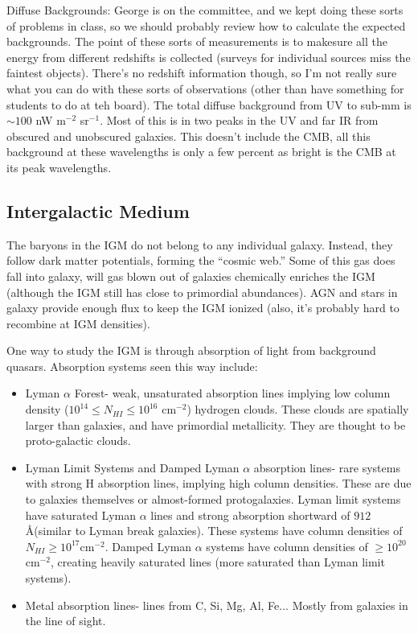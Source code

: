 Diffuse Backgrounds:\newline
George is on the committee, and we kept doing these sorts of problems in 
class, so we should probably review how to calculate the expected backgrounds.  
The point of these sorts of measurements is to makesure all the energy 
from different redshifts is collected (surveys for individual sources 
miss the faintest objects).  There's no redshift information though, so I'm not 
really sure what you can do with these sorts of observations (other than 
have something for students to do at teh board).  The total diffuse 
background from UV to sub-mm is $\sim100$ nW m$^{-2}$ sr$^{-1}$.  Most of 
this is in two peaks in the UV and far IR from obscured and unobscured 
galaxies.  This doesn't include the CMB, all this background at these 
wavelengths is only a few percent as bright is the CMB at its peak 
wavelengths.  

\subsection{Intergalactic Medium}
The baryons in the IGM do not belong to any individual galaxy.  Instead, 
they follow dark matter potentials, forming the ``cosmic web.''  Some of 
this gas does fall into galaxy, will gas blown out of galaxies chemically 
enriches the IGM (although the IGM still has close to primordial abundances).  
AGN and stars in galaxy provide enough flux to keep the IGM ionized (also, 
it's probably hard to recombine at IGM densities).  

One way to study the IGM is through absorption of light from background 
quasars.  Absorption systems seen this way include:
\begin{itemize}
\item Lyman $\alpha$ Forest- weak, unsaturated absorption lines implying low 
column density ($10^{14}\leq N_{HI}\leq10^{16}$ cm$^{-2}$) hydrogen clouds.  These clouds 
are spatially larger than galaxies, and have primordial metallicity.  They 
are thought to be proto-galactic clouds.  
\item Lyman Limit Systems and Damped Lyman $\alpha$ absorption lines- rare 
systems with strong H absorption lines, implying high column densities.  These 
are due to galaxies themselves or almost-formed protogalaxies.  Lyman limit 
systems have saturated Lyman $\alpha$ lines and strong absorption shortward 
of $912$\AA (similar to Lyman break galaxies).  These systems have column 
densities of $N_{HI}\geq10^17$cm$^{-2}$.  Damped Lyman $\alpha$ systems 
have column densities of $\geq10^20$ cm$^{-2}$, creating heavily saturated 
lines (more saturated than Lyman limit systems).  
\item Metal absorption lines- lines from C, Si, Mg, Al, Fe...  Mostly from 
galaxies in the line of sight.  
\end{itemize}

